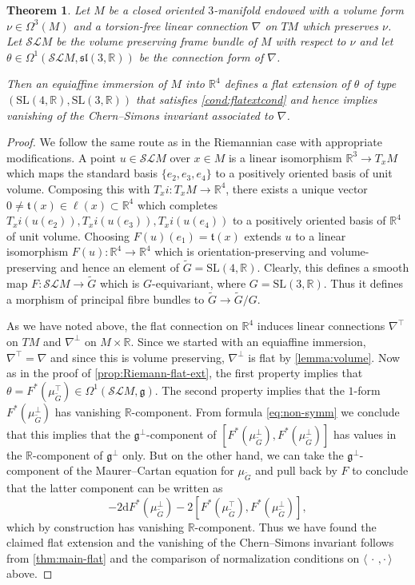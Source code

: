 \documentclass[british,11pt,a4paper]{amsart}
\numberwithin{equation}{section}
\renewcommand\frak{\mathfrak}
\renewcommand\Bbb{\mathbb}
\newcommand\Cal{\mathcal}
\newcommand{\x}{\times}
\newcommand{\Om}{\Omega}
\newcommand{\B}[2]{\langle#1,#2\rangle}
\renewcommand*{\d}{\mathrm{d}}
\newcommand*{\R}{\mathbb{R}}
\newcommand{\col}{:}
\newcounter{theorem}
\numberwithin{theorem}{section}
\newtheorem{thm}[theorem]{Theorem}
\theoremstyle{definition}
\theoremstyle{remark}
\begin{document}
\begin{thm}\label{thm:equiaffine}
Let $M$ be a closed oriented $3$-manifold endowed with a  volume form
  $\nu\in\Om^3(M)$ and a torsion-free linear connection $\nabla$ on $TM$ which
preserves $\nu$. Let $\Cal{SL}M$ be the volume preserving frame bundle of $M$ with
respect to $\nu$ and let $\theta\in\Om^1(\Cal{SL}M,\mathfrak{sl}(3,\R))$ be the
connection form of $\nabla$.

Then an equiaffine immersion of $M$ into $\R^4$ defines a flat extension of $\theta$
of type $(\mathrm{SL}(4,\R),\mathrm{SL}(3,\R))$ that satisfies
\eqref{cond:flatextcond} and hence implies vanishing of the Chern--Simons invariant
associated to $\nabla$.
\end{thm}
\begin{proof}
We follow the same route as in the Riemannian case with appropriate modifications. A
point $u\in \Cal{SL}M$ over $x\in M$ is a linear isomorphism $\R^3\to T_xM$ which
maps the standard basis $\{e_2,e_3,e_4\}$ to a positively oriented basis of unit
volume. Composing this with $T_xi\col T_xM\to\R^4$, there exists a unique vector
$0\neq \frak{t}(x)\in\ell(x)\subset\R^4$ which completes
$T_xi(u(e_2)),T_xi(u(e_3)),T_xi(u(e_4))$ to a positively oriented basis of $\R^4$ of
unit volume. Choosing $F(u)(e_1)=\frak{t}(x)$ extends $u$ to a linear isomorphism
$F(u)\col\R^4\to\R^4$ which is orientation-preserving and volume-preserving and hence
an element of $\tilde G=\mathrm{SL}(4,\R)$. Clearly, this defines a smooth map
$F\col\Cal{SL}M\to \tilde G$ which is $G$-equivariant, where
$G=\mathrm{SL}(3,\R)$. Thus it defines a morphism of principal fibre bundles to
$\tilde G\to \tilde G/G$.

As we have noted above, the flat connection on $\R^4$ induces linear connections
$\nabla^\top$ on $TM$ and $\nabla^\perp$ on $M\x\R$. Since we started with an
equiaffine immersion, $\nabla^\top=\nabla$ and since this is volume preserving, 
$\nabla^\perp$ is flat by \cref{lemma:volume}. Now as in the proof of
\cref{prop:Riemann-flat-ext}, the first property implies that
$\theta=F^*(\mu_{\widetilde G}^\top)\in\Om^1(\Cal{SL}M,\frak{g})$. The second property
implies that the $1$-form $F^*(\mu_{\widetilde G}^\perp)$ has vanishing $\Bbb
R$-component. From formula \eqref{eq:non-symm} we conclude that this implies that the
$\frak{g}^\perp$-component of $[F^*(\mu_{\widetilde G}^\perp),F^*(\mu_{\widetilde
G}^\perp)]$ has values in the $\R$-component of $\frak{g}^\perp$ only. But on
the other hand, we can take the $\frak{g}^\perp$-component of the Maurer--Cartan
equation for $\mu_{\widetilde G}$ and pull back by $F$ to conclude that the latter
component can be written as
\[
-2\d F^*(\mu_{\widetilde G}^\perp)-2[F^*(\mu_{\widetilde G}^\top),F^*(\mu_{\widetilde
G}^\perp)], 
\]
which by construction has vanishing $\R$-component. Thus we have found the
claimed flat extension and the vanishing of the Chern--Simons invariant follows from \cref{thm:main-flat} and the comparison of normalization conditions on
$\B{\,\cdot\,}{\cdot\,}$ above.
\end{proof}
\end{document}
